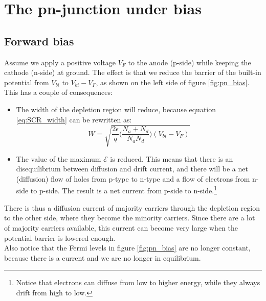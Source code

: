 \section{The pn-junction under bias}

\subsection{Forward bias}
Assume we apply a positive voltage $V_F$ to the anode (p-side) while keeping the cathode (n-side) at ground. The effect is that we reduce the barrier of the built-in potential from $V_{bi}$ to $V_{bi} - V_F$, as shown on the left side of figure \ref{fig:pn_bias}. This has a couple of consequences:
\begin{itemize}
    \item The width of the depletion region will reduce, because equation \ref{eq:SCR_width} can be rewritten as:
    \begin{equation}
        W = \sqrt{\frac{2 \epsilon}{q} \Big(\frac{N_a + N_d}{N_a N_d}\Big) (V_{bi} - V_F)}
        \label{eq:SCR_width_bias}
    \end{equation}
    \item The value of the maximum $\mathcal{E}$ is reduced. This means that there is an disequilibrium between diffusion and drift current, and there will be a net (diffusion) flow of holes from p-type to n-type and a flow of electrons from n-side to p-side. The result is a net current from p-side to n-side.\footnote{Notice that electrons can diffuse from low to higher energy, while they always drift from high to low.}
\end{itemize}
There is thus a diffusion current of majority carriers through the depletion region to the other side, where they become the minority carriers. Since there are a lot of majority carriers available, this current can become very large when the potential barrier is lowered enough.\\
Also notice that the Fermi levels in figure \ref{fig:pn_bias} are no longer constant, because there is a current and we are no longer in equilibrium.

